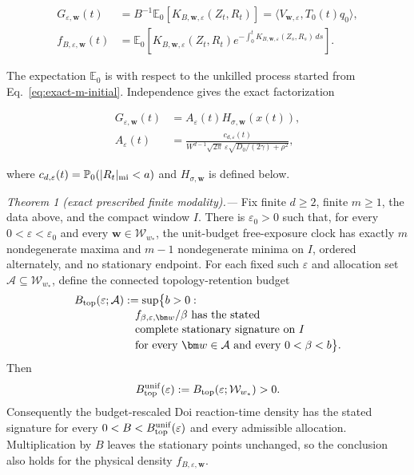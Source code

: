 \begin{equation}
 \begin{aligned}
 G_{\varepsilon,\bm w}(t)
 &=B^{-1}\mathbb E_0[K_{B,\bm w,\varepsilon}(Z_t,R_t)]
 =\langle V_{\bm w,\varepsilon},T_0(t)q_0\rangle,\\
 f_{B,\varepsilon,\bm w}(t)
 &=\mathbb E_0\!\left[K_{B,\bm w,\varepsilon}(Z_t,R_t)
  e^{-\int_0^tK_{B,\bm w,\varepsilon}(Z_s,R_s)\,ds}\right].
 \end{aligned}
 \label{eq:exact-m-observables}
\end{equation}

The expectation $\mathbb E_0$ is with respect to the unkilled process started
from Eq.~\eqref{eq:exact-m-initial}.  Independence gives the exact
factorization

\begin{align}
 G_{\varepsilon,\bm w}(t)
 &=A_\varepsilon(t)H_{\sigma,\bm w}(x(t)),\nonumber\\
 A_\varepsilon(t)
 &=\frac{c_{d,\varepsilon}(t)}
 {W^{d-1}\sqrt{2\pi}\,\varepsilon
  \sqrt{D_0/(2\gamma)+\rho^2}},
 \label{eq:exact-m-factorization}
\end{align}

where $c_{d,\varepsilon}(t)=
\mathbb P_0(|R_t|_{\rm mi}<a)$ and $H_{\sigma,\bm w}$ is defined below.

\medskip
\noindent\textit{Theorem 1 (exact prescribed finite modality).---}
Fix finite $d\ge2$, finite $m\ge1$, the data above, and the compact window
$I$.  There is $\varepsilon_0>0$ such that, for every
$0<\varepsilon<\varepsilon_0$ and every
$\bm w\in\mathcal W_{w_*}$, the unit-budget free-exposure clock has exactly
$m$ nondegenerate maxima and $m-1$ nondegenerate minima on $I$, ordered
alternately, and no stationary endpoint.  For each fixed such
$\varepsilon$ and allocation set
$\mathcal A\subseteq\mathcal W_{w_*}$, define the connected
topology-retention budget
\begin{align}
 B_{\rm top}(\varepsilon;\mathcal A)
 &:=\sup\bigl\{b>0:\nonumber\\[-2pt]
 &\quad f_{\beta,\varepsilon,\bm w}/\beta
 \text{ has the stated}\nonumber\\[-2pt]
 &\quad\text{complete stationary signature on }I
 \nonumber\\[-2pt]
 &\quad\text{for every }\bm w\in\mathcal A
 \text{ and every }0<\beta<b\bigr\}.
 \label{eq:exact-m-btop}
\end{align}
Then
\begin{equation}
 B_{\rm top}^{\rm unif}(\varepsilon)
 :=B_{\rm top}(\varepsilon;\mathcal W_{w_*})>0.
 \label{eq:exact-m-btop-unif}
\end{equation}
Consequently the budget-rescaled Doi reaction-time density has the stated
signature for every
$0<B<B_{\rm top}^{\rm unif}(\varepsilon)$ and every admissible allocation.
Multiplication by $B$ leaves the stationary points unchanged, so the
conclusion also holds for the physical density
$f_{B,\varepsilon,\bm w}$.

